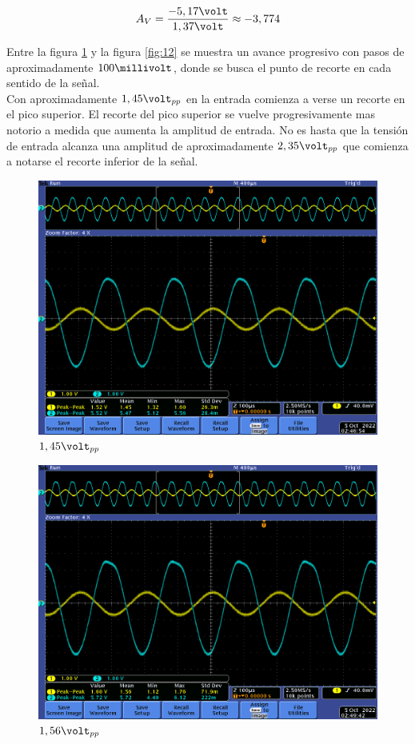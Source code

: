 \documentclass[12pt,letterpaper]{article}     %
\begin{document}
{\begin{equation}
	A_V=
	\frac{
		-5,17\volt
	}{
		1,37\volt
	}\approx
	-3,774
\label{ecu:AVMed2}
\end{equation}

\newpage
Entre la figura \ref{fig:3} y la figura \ref{fig:12} se muestra un avance progresivo con 
pasos de aproximadamente $100\millivolt$, donde se busca el punto de recorte en cada sentido
de la señal.\\
Con aproximadamente $1,45\volt_{pp}$ en la entrada comienza a verse un recorte en el pico superior.
El recorte del pico superior se vuelve progresivamente mas notorio a medida que aumenta la amplitud
de entrada. No es hasta que la tensión de entrada alcanza una amplitud de aproximadamente $2,35\volt_{pp}$
que comienza a notarse el recorte inferior de la señal.

\begin{figure}[!ht]
\centering
\includegraphics[scale=0.5]{imagenes/3.png}
\caption{$1,45\volt_{pp}$}
\label{fig:3}
\end{figure}

\begin{figure}[!ht]
\centering
\includegraphics[scale=0.5]{imagenes/4.png}
\caption{$1,56\volt_{pp}$}
\label{fig:4}
\end{figure}

}
\end{document}
